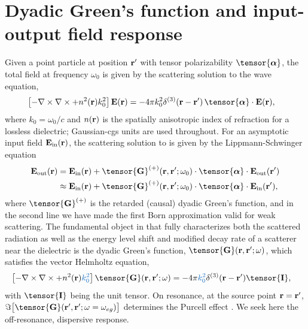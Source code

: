 \documentclass[preprint,aps,pra,onecolumn]{revtex4-1} %
\newcommand{\inp}{{\rm in}}
\newcommand{\out}{{\rm out}}
\newcommand{\change}[1]{{\color{RoyalBlue} #1}}
\newcommand{\comment}[1]{{\color{Maroon} #1}}
\begin{document}
\section{Dyadic Green's function and input-output field response}

Given a point particle at position $\mathbf{r}'$ with tensor polarizability $\tensor{\boldsymbol{\alpha}}$, the total field  at frequency $\omega_0$ is given by the scattering solution to the wave equation, 
	\begin{align}\label{eq:Maxwellwithsource2}
		\left[ - \nabla \times\nabla \times + n^2(\br)k_0^2 \right] \mathbf{E}(\br) &= -4\pi  k_0^2 
		\delta^{(3)}(\br-\br')\,  \tensor{\boldsymbol{\alpha}}\cdot \mathbf{E}(\br),
	\end{align}
where $k_0=\omega_0/c$ and $n(\mathbf{r})$ is the spatially anisotropic index of refraction \comment{for a lossless dielectric}; Gaussian-cgs units are used throughout.  For an asymptotic input field $\mathbf{E}_{\inp}(\br)$, the scattering solution to  is given by the Lippmann-Schwinger equation \cite{wubs_multiple-scattering_2004}
	\begin{align}
		\mathbf{E}_{\out}(\br) &=\mathbf{E}_{\inp}(\br)+\tensor{\mathbf{G}}^{(+)}(\br , \br'; \omega_0)\cdot 
\tensor{\boldsymbol{\alpha}}\cdot \mathbf{E}_{\out}(\br')\\
		&\approx \mathbf{E}_{\inp}(\br)+ \tensor{\mathbf{G}}^{(+)}(\br , \br'; \omega_0) \cdot 
\tensor{\boldsymbol{\alpha}}\cdot \mathbf{E}_{\inp}(\br'), \label{Eq::ScatteredField}
	\end{align}
where $\tensor{\mathbf{G}}^{(+)}$ is the retarded (causal) dyadic Green's function, and in the second line we have made the first Born approximation valid for weak scattering. The fundamental object in  that fully characterizes both the scattered radiation as well as the energy level shift and modified decay rate of a scatterer near the dielectric is the dyadic Green's function, $\tensor{\mathbf{G}}(\br, \br';\omega)$, which satisfies the vector Helmholtz equation,
	\begin{align}
		\left[ -\nabla\times\nabla\times + n^2(\mbf{r}) \change{k_0^2} \right] \tensor{\mathbf{G}}(\br, \br';\omega) &= -4 \pi 
\change{k_0^2} \delta^{(3)}(\mathbf{r}-\mathbf{r}') \tensor{\mathbf{I}},
	\end{align}
with $ \tensor{\mathbf{I}}$ being the unit tensor.  On resonance, at the source point $\mathbf{r}=\mathbf{r}'$, $\Im \big[\tensor{\mathbf{G}}(\br', \br'; \omega= \omega_{eg}) \big]$ determines the Purcell effect \cite{}.  We 
seek here the off-resonance, dispersive response.
\end{document}

